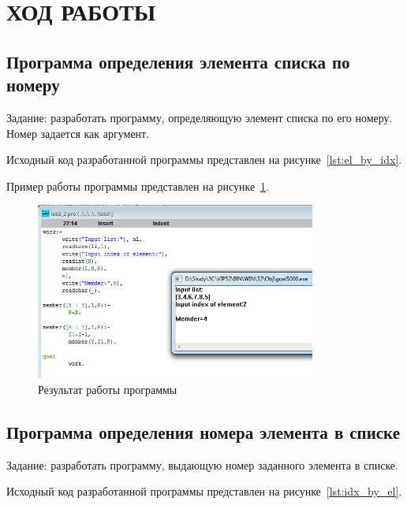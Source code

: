 \section{ХОД РАБОТЫ}

\subsection{Программа определения элемента списка по номеру}

Задание: разработать программу, определяющую элемент списка по его номеру.
Номер задается как аргумент.

Исходный код разработанной программы представлен на
рисунке~\ref{lst:el_by_idx}.



Пример работы программы представлен на рисунке~\ref{fig:el_by_idx}.

\begin{figure}[h!]
  \centering
  \includegraphics[width=92mm]{img/el_by_idx}
  \caption{Результат работы программы}
  \label{fig:el_by_idx}
\end{figure}


\subsection{Программа определения номера элемента в списке}

Задание: разработать программу, выдающую номер заданного элемента в списке.

Исходный код разработанной программы представлен на
рисунке~\ref{lst:idx_by_el}.



